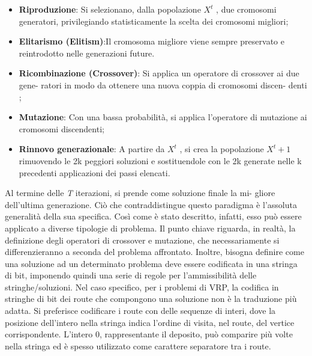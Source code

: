 \documentclass[]{article}
\begin{document}
\begin{itemize}
\item \textbf{Riproduzione}: Si selezionano, dalla popolazione \emph{$X^t$} , due cromosomi
generatori, privilegiando statisticamente la scelta dei cromosomi
migliori;
\item \textbf{Elitarismo (Elitism)}:Il cromosoma migliore viene sempre preservato e reintrodotto nelle generazioni future.

\item \textbf{Ricombinazione (Crossover)}: Si applica un operatore di crossover ai due gene-
ratori in modo da ottenere una nuova coppia di cromosomi discen-
denti ;

\item  \textbf{Mutazione}: Con una bassa probabilità, si applica l’operatore di mutazione ai cromosomi discendenti;
\item  \textbf{Rinnovo generazionale}: A partire da \emph{$X^t$} , si crea la popolazione \emph{$X^t+1$} rimuovendo le 2k peggiori soluzioni e sostituendole con le 2k generate nelle k precedenti applicazioni dei passi elencati.
\end{itemize}
Al termine delle \emph{T} iterazioni, si prende come soluzione finale la mi-
gliore dell’ultima generazione.
Ciò che contraddistingue questo paradigma è l’assoluta generalità della sua specifica. Così come è stato descritto, infatti, esso può essere
applicato a diverse tipologie di problema. Il punto chiave riguarda, in
realtà, la definizione degli operatori di crossover e mutazione, che necessariamente si differenzieranno a seconda del problema affrontato. Inoltre,
bisogna definire come una soluzione ad un determinato problema deve
essere codificata in una stringa di bit, imponendo quindi una serie di
regole per l’ammissibilità delle stringhe/soluzioni.
Nel caso specifico, per i problemi di VRP, la codifica in stringhe di
bit dei route che compongono una soluzione non è la traduzione più
adatta. Si preferisce codificare i route con delle sequenze di interi, dove
la posizione dell’intero nella stringa indica l’ordine di visita, nel route,
del vertice corrispondente. L’intero 0, rappresentante il deposito, può
comparire più volte nella stringa ed è spesso utilizzato come carattere
separatore tra i route.
\end{document}
